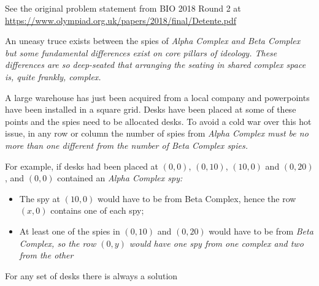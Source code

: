 \begin{center}\small{
  See the original problem statement from BIO 2018 Round 2 at
  \url{https://www.olympiad.org.uk/papers/2018/final/Detente.pdf}
}\end{center}

An uneasy truce exists between the spies of \it{Alpha Complex} and \it{Beta Complex}
but some fundamental differences exist on core pillars of ideology. These
differences are so deep-seated that arranging the seating in shared complex space
is, quite frankly, complex.

A large warehouse has just been acquired from a local company and powerpoints
have been installed in a square grid. Desks have been placed at some of
these points and the spies need to be allocated desks. To avoid a cold war over
this hot issue, in any row or column the number of spies from \it{Alpha Complex}
must be no more than one different from the number of \it{Beta Complex} spies.

For example, if desks had been placed at $(0,0)$, $(0,10)$, $(10,0)$ and $(0,20)$, and
$(0,0)$ contained an \it{Alpha Complex} spy:

\begin{itemize}
  \item The spy at $(10,0)$ would have to be from Beta Complex, hence the row $(x,0)$
  contains one of each spy;

  \item At least one of the spies in $(0,10)$ and $(0,20)$ would have to be from
  \it{Beta Complex}, so the row $(0,y)$ would have one spy from one complex and
  two from the other
\end{itemize}

For any set of desks there is always a solution
